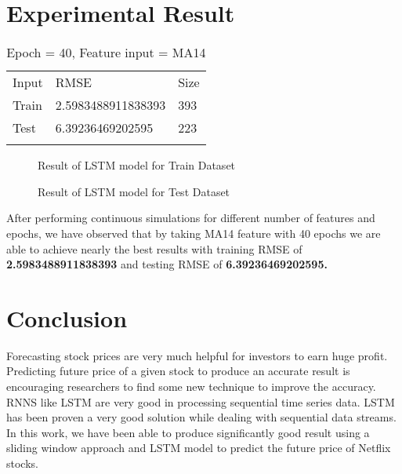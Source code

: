 \documentclass[5p,,preprint,12pt,twocolumn]{elsarticle}
\makeatletter
\def\tblbottomrule{\noalign{\vspace*{6pt}}\hline\noalign{\vspace*{2pt}}}
\def\tblmidrule{\noalign{\vspace*{6pt}}\hline\noalign{\vspace*{2pt}}}
\def\fixFloatSize#1{}%
\makeatother
\begin{document}
    
\section{\textbf{Experimental Result}}

\begin{table}[!htbp]
\caption{{Epoch = 40, Feature input = MA14} }
\label{tw-dcd07506a414}
\def\arraystretch{1}
\ignorespaces 
\centering 
\begin{tabulary}{\linewidth}{LLL}
\hline 
Input & RMSE & Size\\
\tblmidrule 
Train &
  2.5983488911838393 &
  393\\
Test &
  6.39236469202595 &
  223\\
\tblbottomrule 
\end{tabulary}\par 
\end{table}

\bgroup
\fixFloatSize{images/723bbe78-9395-4ad9-b847-0eec02b39824-u95-5-ma14-nflx-40-e-train.png}
\begin{figure}[!htbp]
\centering \makeatletter{}
\makeatother 
\caption{{Result of LSTM model for Train Dataset}}
\label{f-817bed2af17b}
\end{figure}
\egroup

\bgroup
\fixFloatSize{images/efbccd2d-0836-49e8-837d-9fa72e810469-u95-5-ma14-nflx-40-e.png}
\begin{figure}[!htbp]
\centering \makeatletter{}
\makeatother 
\caption{{Result of LSTM model for Test Dataset}}
\label{f-09a04fe25613}
\end{figure}
\egroup
After performing continuous simulations for different number of features and epochs, we have observed that by taking MA14 feature with 40 epochs we are able to achieve nearly the best results with training RMSE of \textbf{2.5983488911838393} and testing RMSE of \textbf{6.39236469202595.}
    
\section{\textbf{Conclusion} \textbf{\space }}
Forecasting stock prices are very much helpful for investors to earn huge profit. Predicting future price of a given stock to produce an accurate result is encouraging researchers to find some new technique to improve the accuracy. RNNS like LSTM are very good in processing sequential time series data. LSTM has been proven a very good solution while dealing with sequential data streams. In this work, we have been able to produce significantly good result using a sliding window approach and LSTM model to predict the future price of Netflix stocks.


    






\end{document}
